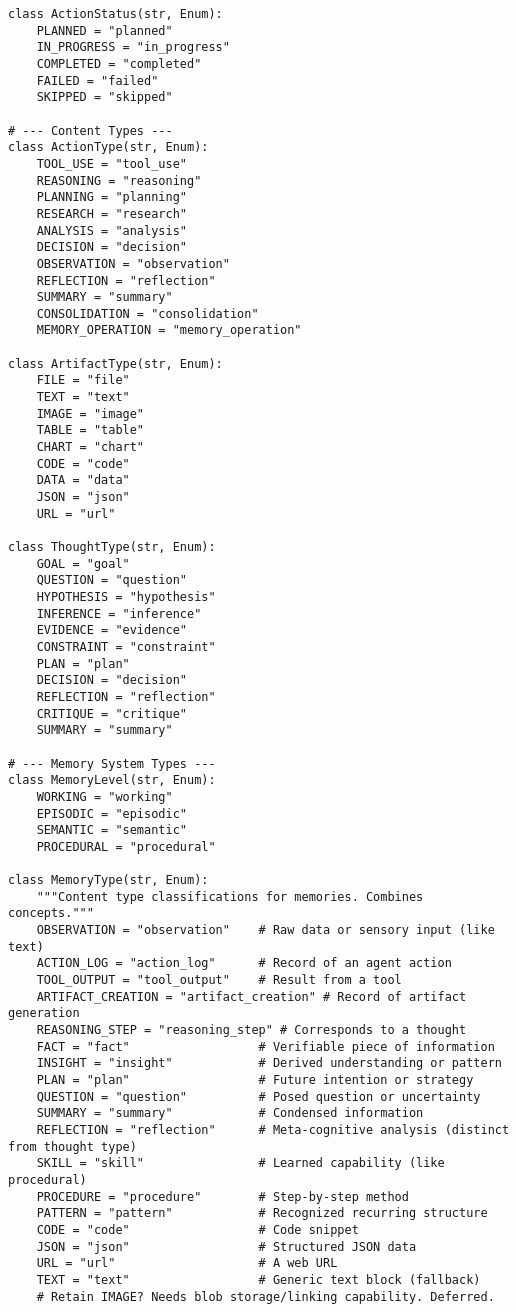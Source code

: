 \documentclass[12pt,a4paper]{article}
\begin{document}
\begin{pageablecode}
\begin{verbatim}
class ActionStatus(str, Enum):
    PLANNED = "planned"
    IN_PROGRESS = "in_progress"
    COMPLETED = "completed"
    FAILED = "failed"
    SKIPPED = "skipped"

# --- Content Types ---
class ActionType(str, Enum):
    TOOL_USE = "tool_use"
    REASONING = "reasoning"
    PLANNING = "planning"
    RESEARCH = "research"
    ANALYSIS = "analysis"
    DECISION = "decision"
    OBSERVATION = "observation"
    REFLECTION = "reflection"
    SUMMARY = "summary"
    CONSOLIDATION = "consolidation"
    MEMORY_OPERATION = "memory_operation" 

class ArtifactType(str, Enum):
    FILE = "file"
    TEXT = "text"
    IMAGE = "image"
    TABLE = "table"
    CHART = "chart"
    CODE = "code"
    DATA = "data"
    JSON = "json" 
    URL = "url"   

class ThoughtType(str, Enum):
    GOAL = "goal"
    QUESTION = "question"
    HYPOTHESIS = "hypothesis"
    INFERENCE = "inference"
    EVIDENCE = "evidence"
    CONSTRAINT = "constraint"
    PLAN = "plan"
    DECISION = "decision"
    REFLECTION = "reflection"
    CRITIQUE = "critique"
    SUMMARY = "summary"

# --- Memory System Types ---
class MemoryLevel(str, Enum):
    WORKING = "working"
    EPISODIC = "episodic"
    SEMANTIC = "semantic"
    PROCEDURAL = "procedural"

class MemoryType(str, Enum):
    """Content type classifications for memories. Combines concepts."""
    OBSERVATION = "observation"    # Raw data or sensory input (like text)
    ACTION_LOG = "action_log"      # Record of an agent action
    TOOL_OUTPUT = "tool_output"    # Result from a tool
    ARTIFACT_CREATION = "artifact_creation" # Record of artifact generation
    REASONING_STEP = "reasoning_step" # Corresponds to a thought
    FACT = "fact"                  # Verifiable piece of information
    INSIGHT = "insight"            # Derived understanding or pattern
    PLAN = "plan"                  # Future intention or strategy
    QUESTION = "question"          # Posed question or uncertainty
    SUMMARY = "summary"            # Condensed information
    REFLECTION = "reflection"      # Meta-cognitive analysis (distinct from thought type)
    SKILL = "skill"                # Learned capability (like procedural)
    PROCEDURE = "procedure"        # Step-by-step method
    PATTERN = "pattern"            # Recognized recurring structure
    CODE = "code"                  # Code snippet
    JSON = "json"                  # Structured JSON data
    URL = "url"                    # A web URL
    TEXT = "text"                  # Generic text block (fallback)
    # Retain IMAGE? Needs blob storage/linking capability. Deferred.


\end{verbatim}
\end{pageablecode}
\end{document}
